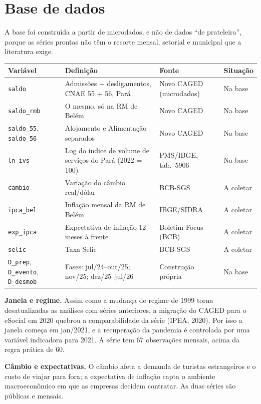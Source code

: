 \documentclass[11pt,a4paper]{article}
\newcommand{\var}[1]{\texttt{#1}}
\begin{document}
\section{Base de dados}

A base foi construída a partir de microdados, e não de dados ``de prateleira'', porque as séries
prontas não têm o recorte mensal, setorial e municipal que a literatura exige.

\begin{table}[H]
\centering\small
\begin{tabularx}{\linewidth}{p{3.3cm}Lp{2.6cm}p{1.9cm}}
\toprule
\textbf{Variável} & \textbf{Definição} & \textbf{Fonte} & \textbf{Situação}\\
\midrule
\var{saldo} & Admissões $-$ desligamentos, CNAE 55 + 56, Pará & Novo CAGED (microdados) & Na base\\
\var{saldo\_rmb} & O mesmo, só na RM de Belém & Novo CAGED & Na base\\
\var{saldo\_55}, \var{saldo\_56} & Alojamento e Alimentação separados & Novo CAGED & Na base\\
\var{ln\_ivs} & Log do índice de volume de serviços do Pará (2022 = 100) & PMS/IBGE, tab.\ 5906 & Na base\\
\var{cambio} & Variação do câmbio real/dólar & BCB-SGS & A coletar\\
\var{ipca\_bel} & Inflação mensal da RM de Belém & IBGE/SIDRA & A coletar\\
\var{exp\_ipca} & Expectativa de inflação 12 meses à frente & Boletim Focus (BCB) & A coletar\\
\var{selic} & Taxa Selic & BCB-SGS & A coletar\\
\var{D\_prep}, \var{D\_evento}, \var{D\_desmob} & Fases: jul/24--out/25; nov/25; dez/25--jul/26 & Construção própria & Na base\\
\bottomrule
\end{tabularx}
\end{table}

\textbf{Janela e regime.} Assim como a mudança de regime de 1999 torna desatualizadas as análises
com séries anteriores, a migração do CAGED para o eSocial em 2020 quebrou a comparabilidade da série
(IPEA, 2020). Por isso a janela começa em jan/2021, e a recuperação da pandemia é controlada por uma
variável indicadora para 2021. A série tem 67 observações mensais, acima da regra prática de 60.

\textbf{Câmbio e expectativas.} O câmbio afeta a demanda de turistas estrangeiros e o custo de viajar
para fora; a expectativa de inflação capta o ambiente macroeconômico em que as empresas decidem
contratar. As duas séries são públicas e mensais.
\end{document}
